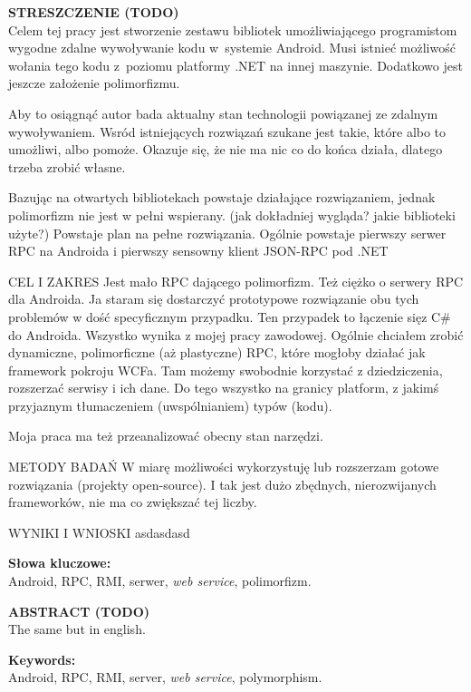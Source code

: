 \documentclass[twoside,a4paper]{book}
\begin{document}



{\noindent \large \textbf{STRESZCZENIE (TODO)}} \\
Celem tej pracy jest stworzenie zestawu bibliotek umożliwiającego programistom wygodne zdalne wywoływanie kodu w~systemie Android. Musi istnieć możliwość wołania tego kodu z~poziomu platformy .NET na innej maszynie.
Dodatkowo jest jeszcze założenie polimorfizmu.

Aby to osiągnąć autor bada aktualny stan technologii powiązanej ze zdalnym wywoływaniem. Wsród istniejących rozwiązań szukane jest takie, które albo to umożliwi, albo pomoże.
Okazuje się, że nie ma nic co do końca działa, dlatego trzeba zrobić własne.

Bazując na otwartych bibliotekach powstaje działające rozwiązaniem, jednak polimorfizm nie jest w pełni wspierany. (jak dokładniej wygląda? jakie biblioteki użyte?)
Powstaje plan na pełne rozwiązania.
Ogólnie powstaje pierwszy serwer RPC na Androida i pierwszy sensowny klient JSON-RPC pod .NET

CEL I ZAKRES
Jest mało RPC dającego polimorfizm. Też ciężko o serwery RPC dla Androida. Ja staram się dostarczyć prototypowe rozwiązanie obu tych problemów w dość specyficznym przypadku. Ten przypadek to łączenie sięz C\# do Androida. Wszystko wynika z mojej pracy zawodowej.
Ogólnie chciałem zrobić dynamiczne, polimorficzne (aż plastyczne) RPC, które mogłoby działać jak framework pokroju WCFa. Tam możemy swobodnie korzystać z dziedziczenia, rozszerzać serwisy i ich dane. Do tego wszystko na granicy platform, z jakimś przyjaznym tłumaczeniem (uwspólnianiem) typów (kodu).

Moja praca ma też przeanalizować obecny stan narzędzi.

METODY BADAŃ 
W miarę możliwości wykorzystuję lub rozszerzam gotowe rozwiązania (projekty open-source). I tak jest dużo zbędnych, nierozwijanych frameworków, nie ma co zwiększać tej liczby.

WYNIKI I WNIOSKI
asdasdasd

\textbf{Słowa kluczowe:} \\
Android, RPC, RMI, serwer, \emph{web service}, polimorfizm.
\clearpage

{\noindent \large \textbf{ABSTRACT (TODO)}} \\
The same but in english.

\textbf{Keywords:} \\
Android, RPC, RMI, server, \emph{web service}, polymorphism.
\clearpage
\end{document}
